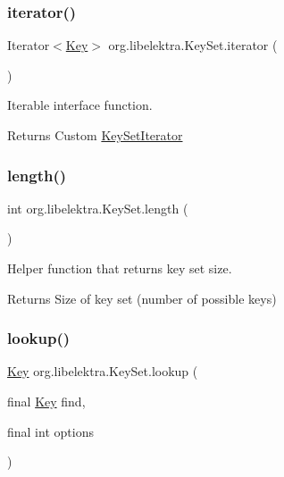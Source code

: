 \subsubsection{\texorpdfstring{iterator()}{iterator()}}
{\footnotesize\ttfamily Iterator$<$\mbox{\hyperlink{classorg_1_1libelektra_1_1Key}{Key}}$>$ org.\+libelektra.\+Key\+Set.\+iterator (\begin{DoxyParamCaption}{ }\end{DoxyParamCaption})\hspace{0.3cm}{\ttfamily [inline]}}



Iterable interface function. 

\begin{DoxyReturn}{Returns}
Custom \mbox{\hyperlink{classorg_1_1libelektra_1_1KeySetIterator}{Key\+Set\+Iterator}} 
\end{DoxyReturn}
\mbox{\label{classorg_1_1libelektra_1_1KeySet_aac3920fa38179de07bcd242207915540}} 
\subsubsection{\texorpdfstring{length()}{length()}}
{\footnotesize\ttfamily int org.\+libelektra.\+Key\+Set.\+length (\begin{DoxyParamCaption}{ }\end{DoxyParamCaption})\hspace{0.3cm}{\ttfamily [inline]}}



Helper function that returns key set size. 

\begin{DoxyReturn}{Returns}
Size of key set (number of possible keys) 
\end{DoxyReturn}
\mbox{\label{classorg_1_1libelektra_1_1KeySet_a6fb319a768b1cb43464154a93f9a2e93}} 
\subsubsection{\texorpdfstring{lookup()}{lookup()}\hspace{0.1cm}{\footnotesize\ttfamily [1/4]}}
{\footnotesize\ttfamily \mbox{\hyperlink{classorg_1_1libelektra_1_1Key}{Key}} org.\+libelektra.\+Key\+Set.\+lookup (\begin{DoxyParamCaption}\item[{final \mbox{\hyperlink{classorg_1_1libelektra_1_1Key}{Key}}}]{find,  }\item[{final int}]{options }\end{DoxyParamCaption})\hspace{0.3cm}{\ttfamily [inline]}}



